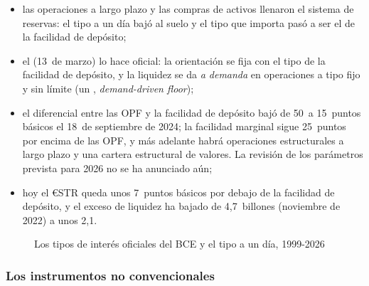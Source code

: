 \documentclass[11pt]{article}
\begin{document}
\begin{itemize}
\begin{itemize}
  \item las operaciones a largo plazo y las compras de activos llenaron el sistema de reservas: el tipo a un día bajó al suelo y el tipo que importa pasó a ser el de la facilidad de depósito;
  \item el  (13~de marzo)\nocite{BCE2024Marco} lo hace oficial: la orientación se fija con el tipo de la facilidad de depósito, y la liquidez se da \emph{a demanda} en operaciones a tipo fijo y sin límite (un , \emph{demand-driven floor});
  \item el diferencial entre las OPF y la facilidad de depósito bajó de 50~a 15~puntos básicos el 18~de septiembre de 2024; la facilidad marginal sigue 25~puntos por encima de las OPF, y más adelante habrá operaciones estructurales a largo plazo y una cartera estructural de valores. La revisión de los parámetros prevista para 2026 no se ha anunciado aún\nocite{BCE2024Marco};
  \item hoy el €STR queda unos 7~puntos básicos por debajo de la facilidad de depósito, y el exceso de liquidez ha bajado de 4,7~billones (noviembre de 2022) a unos 2,1\nocite{BieberLizarazo2026Liquidez}.
  \end{itemize}
\end{itemize}

\begin{figure}[H]
\centering
\caption{Los tipos de interés oficiales del BCE y el tipo a un día, 1999-2026}\label{fig:tipos-bce}
\end{figure}

\subsubsection{Los instrumentos no convencionales}\label{sec:no-convencionales}
\end{document}
